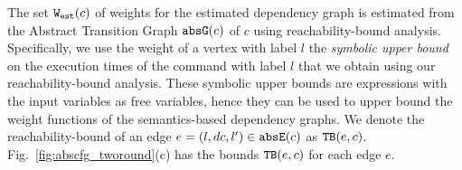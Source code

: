 
The set $\mathtt{{W_{est}}}(c)$ of weights for the estimated dependency graph is estimated from 
the Abstract Transition Graph $\mathtt{abs}{\mathtt{G}}(c)$ of $c$ using reachability-bound analysis.
 Specifically, we use the weight of a vertex with label $l$ the \emph{symbolic upper bound} on the 
 execution times of the command with label $l$ that we obtain using our reachability-bound analysis. 
 These symbolic upper bounds are expressions with the input variables as free variables, 
 hence they can be used to upper bound the weight functions of the semantics-based dependency graphs.
We denote the reachability-bound of an edge $e = (l, dc, l') \in \mathtt{abs}{\mathtt{E}}(c)$ as ${\mathtt{TB}}(e, c)$. Fig.~\ref{fig:abscfg_tworound}(c) has the bounds ${\mathtt{TB}}(e, c)$ for each edge $e$. 
   
